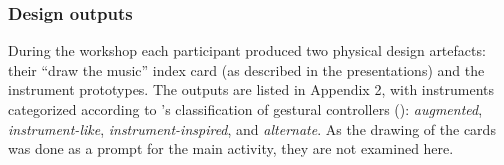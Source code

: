 \documentclass[letterpaper, 12pt]{article}
\begin{document}
\subsubsection{Design outputs}
\label{sec:design-outputs}

During the workshop each participant produced two physical design artefacts: their ``draw the music'' index card (as described in the presentations) and the instrument prototypes. The outputs are listed in Appendix 2, with instruments categorized according to \citeauthor{Miranda2006a}'s classification of gestural controllers (\citeyear{Miranda2006a}): \emph{augmented}, \emph{instrument-like}, \emph{instrument-inspired}, and \emph{alternate}. As the drawing of the cards was done as a prompt for the main activity, they are not examined here. 


\end{document}
